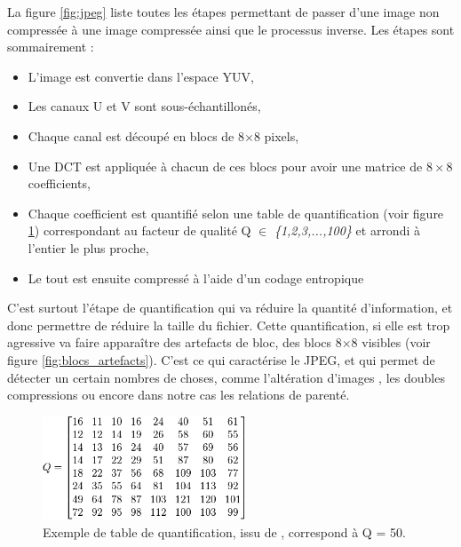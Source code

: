 \documentclass[utf8,final]{stageM2R} %
\begin{document}
La figure \ref{fig:jpeg} liste toutes les étapes permettant de passer d'une image non compressée à une image compressée ainsi que le processus inverse. Les étapes sont sommairement : 

\begin{itemize}
  \item L'image est convertie dans l'espace YUV,
  \item Les canaux U et V sont sous-échantillonés,
  \item Chaque canal est découpé en blocs de 8$\times$8 pixels,
  \item Une DCT est appliquée à chacun de ces blocs pour avoir une matrice de $8\times 8$ coefficients,
  \item Chaque coefficient est quantifié selon une table de quantification (voir figure \ref{fig:quantization_table}) correspondant au facteur de qualité Q $\in$ \textit{\{1,2,3,...,100\}} et arrondi à l'entier le plus proche,
  \item Le tout est ensuite compressé à l'aide d'un codage entropique
\end{itemize}

C'est surtout l'étape de quantification qui va réduire la quantité d'information, et donc permettre de réduire la taille du fichier. Cette quantification, si elle est trop agressive va faire apparaître des artefacts de bloc, des blocs 8$\times$8 visibles (voir figure \ref{fig:blocs_artefacts}). C'est ce qui caractérise le JPEG, et qui permet de détecter un certain nombres de choses, comme l'altération d'images \autocite{bianchi2012image}, les doubles compressions \autocite{bianchi2012detection} ou encore dans notre cas les relations de parenté.

\begin{figure}[H]
  \begin{center}
    \includegraphics[width=60mm]{images/quantization_table.png}
    \caption{Exemple de table de quantification, issu de \autocite{jpeg}, correspond à Q = 50.}
    \label{fig:quantization_table}
  \end{center}
\end{figure}
\end{document}
